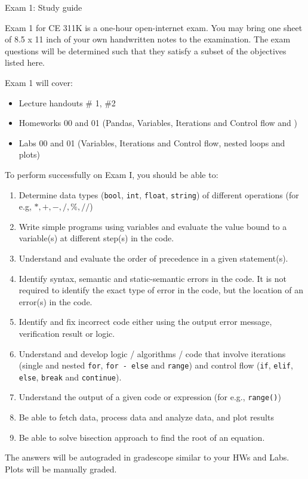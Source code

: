 \documentclass[]{article}
\begin{document}
\begin{center}
\Large Exam 1: Study guide
\end{center}

Exam 1 for CE 311K is a one-hour open-internet exam. You may bring one sheet of 8.5 x 11 inch of your own handwritten notes to the examination. The exam questions will be determined such that they satisfy a subset of the objectives listed here.

Exam 1 will cover:
\begin{itemize}
	\item Lecture handouts \# 1, \#2
	\item Homeworks 00 and 01 (Pandas, Variables, Iterations and Control flow and )
	\item Labs 00 and 01 (Variables, Iterations and Control flow, nested loops and plots)
\end{itemize}

To perform successfully on Exam I, you should be able to:

\begin{enumerate}
	\item Determine data types (\verb|bool|, \verb|int|, \verb|float|, \verb|string|) of different operations (for e.g, $*, +, -, /, \%, //$)
	\item Write simple programs using variables and evaluate the value bound to a variable(s) at different step(s) in the code.
	\item Understand and evaluate the order of precedence in a given statement(s).
	\item Identify syntax, semantic and static-semantic errors in the code. It is not required to identify the exact type of error in the code, but the location of an error(s) in the code.
	\item Identify and fix incorrect code either using the output error message, verification result or logic.
	\item Understand and develop logic / algorithms / code that involve iterations (single and nested \verb|for|, \verb|for - else| and \verb|range|) and control flow (\verb|if|, \verb|elif|, \verb|else|, \verb|break| and \verb|continue|).
	\item Understand the output of a given code or expression (for e.g., \verb|range()|)
	\item Be able to fetch data, process data and analyze data, and plot results
	\item Be able to solve bisection approach to find the root of an equation.


\end{enumerate}

The answers will be autograded in gradescope similar to your HWs and Labs. Plots will be manually graded. 
\end{document}
